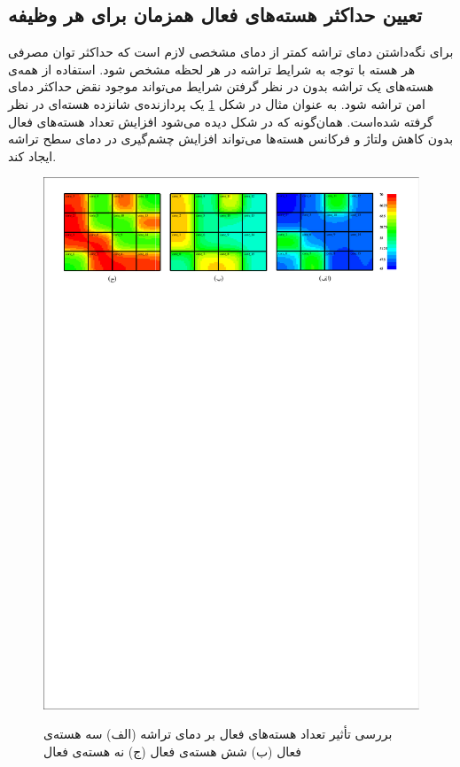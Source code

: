 \subsection{تعیین حداکثر هسته‌های فعال همزمان برای هر وظیفه}
برای نگه‌داشتن دمای تراشه کمتر از دمای مشخصی لازم است که حداکثر توان مصرفی هر هسته با توجه به شرایط تراشه در هر لحظه مشخص ‌شود. استفاده از همه‌ی هسته‌های یک تراشه بدون در نظر گرفتن شرایط می‌تواند موجود نقض حداکثر دمای امن تراشه شود. به عنوان مثال در شکل \ref{fig:ActiveCore} یک پردازنده‌ی شانزده هسته‌ای در نظر گرفته شده‌است. همان‌گونه که در شکل دیده می‌شود افزایش تعداد هسته‌های فعال بدون کاهش ولتاژ و فرکانس هسته‌ها می‌تواند افزایش چشم‌گیری در دمای سطح تراشه ایجاد کند.
 \begin{figure}[b]
	\centering
	\includegraphics[scale=0.92]{images/ActiveCore.pdf}\\[0cm]
	\caption{بررسی تأثیر تعداد هسته‌های فعال بر دمای تراشه (الف) سه هسته‌ی فعال (ب) شش هسته‌ی فعال (ج) نه هسته‌ی فعال}
	\label{fig:ActiveCore}
\end{figure}

